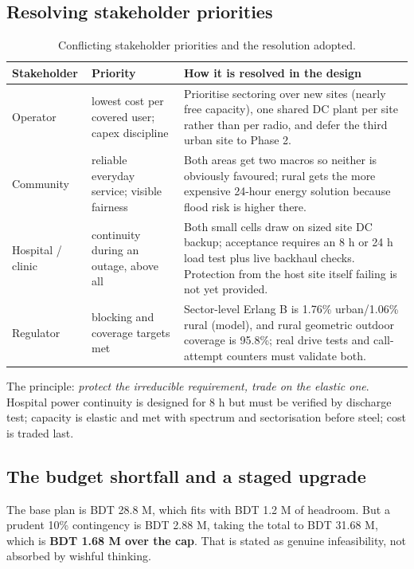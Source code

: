 \documentclass[9pt,a4paper]{extarticle}
\newcommand{\key}[1]{\textbf{#1}}
\begin{document}
\subsection{Resolving stakeholder priorities}
\begin{table}[H]\centering\small
\caption{Conflicting stakeholder priorities and the resolution adopted.}
\begin{tabularx}{\textwidth}{@{}p{2.5cm}p{3.5cm}X@{}}
\toprule
\textbf{Stakeholder} & \textbf{Priority} & \textbf{How it is resolved in the design} \\
\midrule
Operator & lowest cost per covered user; capex discipline & Prioritise sectoring over new sites (nearly free capacity), one shared DC plant per site rather than per radio, and defer the third urban site to Phase 2. \\
Community & reliable everyday service; visible fairness & Both areas get two macros so neither is obviously favoured; rural gets the more expensive 24-hour energy solution because flood risk is higher there. \\
Hospital / clinic & continuity during an outage, above all & Both small cells draw on sized site DC backup; acceptance requires an 8 h or 24 h load test plus live backhaul checks. Protection from the host site itself failing is not yet provided. \\
Regulator & blocking and coverage targets met & Sector-level Erlang B is 1.76\% urban/1.06\% rural (model), and rural geometric outdoor coverage is 95.8\%; real drive tests and call-attempt counters must validate both. \\
\bottomrule
\end{tabularx}
\end{table}

The principle: \emph{protect the irreducible requirement, trade on the elastic one}. Hospital
power continuity is designed for 8 h but must be verified by discharge test; capacity is elastic and met with spectrum and
sectorisation before steel; cost is traded last.

\subsection{The budget shortfall and a staged upgrade}
The base plan is BDT 28.8 M, which fits with BDT 1.2 M of headroom. But a prudent 10\%
contingency is BDT 2.88 M, taking the total to BDT 31.68 M, which is \key{BDT 1.68 M over the cap}.
That is stated as genuine infeasibility, not absorbed by wishful thinking.
\end{document}
